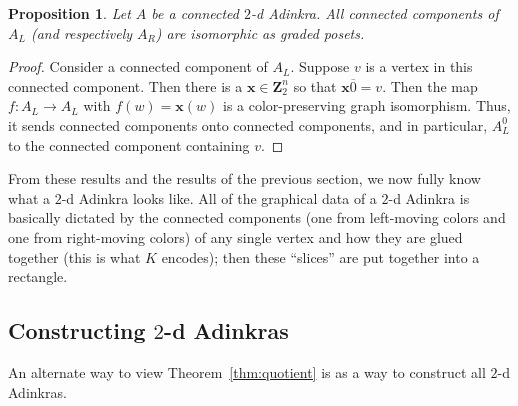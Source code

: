\documentclass[12pt,twoside,singlespace]{article}
\numberwithin{equation}{section}
\newtheorem{prop}[equation]{Proposition}
\theoremstyle{definition}
\newcommand{\ZZ}{\mathbf{Z}}
\renewcommand{\vec}[1]{\mathbf{#1}}
\begin{document}
\begin{prop}
\label{prop:componentsiso}
Let $A$ be a connected $2$-d Adinkra.  All connected components of $A_L$ (and respectively $A_R$) are isomorphic as graded posets.
\end{prop}
\begin{proof}
Consider a connected component of $A_L$.  Suppose $v$ is a vertex in this connected component.  Then there is a $\vec{x}\in\ZZ_2^n$ so that $\vec{x}\overline{0}=v$.  Then the map $f:A_L\to A_L$ with $f(w)=\vec{x}(w)$ is a color-preserving graph isomorphism.  Thus, it sends connected components onto connected components, and in particular, $A_L^0$ to the connected component containing $v$.
\end{proof}

From these results and the results of the previous section, we now fully know what a $2$-d Adinkra looks like. All of the graphical data of a $2$-d Adinkra is basically dictated by the connected components (one from left-moving colors and one from right-moving colors) of any single vertex and how they are glued together (this is what $K$ encodes); then these ``slices'' are put together into a rectangle.

\subsection{Constructing $2$-d Adinkras}
An alternate way to view Theorem~\ref{thm:quotient} is as a way to construct all $2$-d Adinkras.
\end{document}
